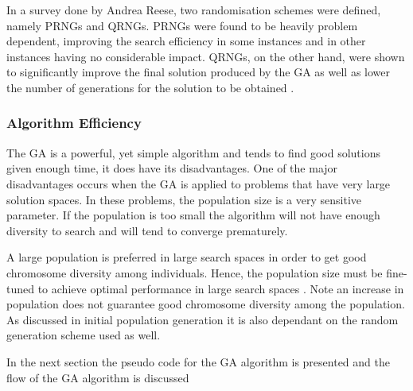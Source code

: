 In a survey done by Andrea Reese\cite{RandomNumberGA}, two randomisation schemes were defined, namely  \glspl{PRNG} and \glspl{QRNG}. \glspl{PRNG} were found to be heavily problem dependent, improving the search efficiency in some instances and in other instances having no considerable impact. QRNGs, on the other hand, were shown to significantly improve the final solution produced by the \gls{GA} as well as lower the number of generations for the solution to be obtained \cite{RandomNumberGA}.

\subsubsection{Algorithm Efficiency}
The \gls{GA} is a powerful, yet simple algorithm and tends to find good solutions given enough time, it does have its disadvantages. One of the major disadvantages occurs when the \gls{GA} is applied to problems that have very large solution spaces. In these problems, the population size is a very sensitive parameter\cite{AdaptiveSAGA,HetergeneousGA,SelfAdaptiveDataMiningGA,PatternDetectionGA}. If the population is too small the algorithm will not have enough diversity to search and will tend to converge prematurely. 

A large population is preferred in large search spaces in order to get good chromosome diversity among individuals. Hence, the population size must be fine-tuned to achieve optimal performance in large search spaces \cite{AdaptiveSAGA,CompuIntelligenceIntro}. Note an increase in population does not guarantee good chromosome diversity among the population. As discussed in initial population generation it is also dependant on the random generation scheme used as well. 


In the next section the pseudo code for the \gls{GA} algorithm is presented and the flow of the \gls{GA} algorithm is discussed

